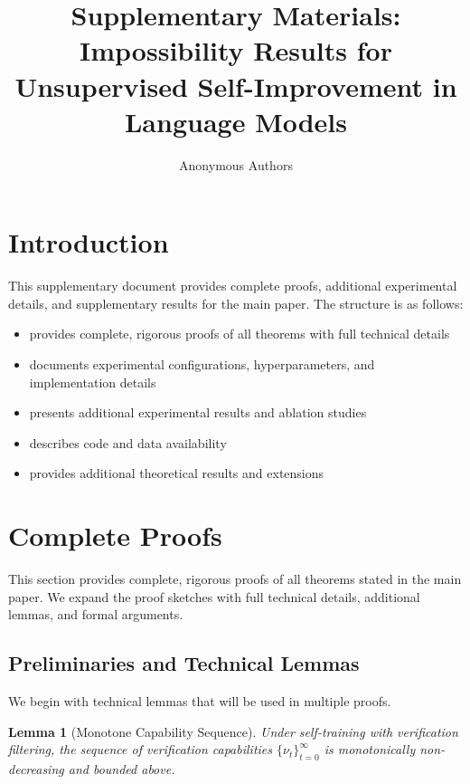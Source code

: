 \documentclass{article}
\title{Supplementary Materials: \\
Impossibility Results for Unsupervised Self-Improvement in Language Models}
\author{Anonymous Authors}
\newtheorem{lemma}[theorem]{Lemma}
\theoremstyle{definition}
\theoremstyle{remark}
\begin{document}
\maketitle

\tableofcontents

\section{Introduction}

This supplementary document provides complete proofs, additional experimental details, and supplementary results for the main paper. The structure is as follows:

\begin{itemize}
\item {} provides complete, rigorous proofs of all theorems with full technical details
\item {} documents experimental configurations, hyperparameters, and implementation details
\item {} presents additional experimental results and ablation studies
\item {} describes code and data availability
\item {} provides additional theoretical results and extensions
\end{itemize}

\section{Complete Proofs}
\label{sec:complete-proofs}

This section provides complete, rigorous proofs of all theorems stated in the main paper. We expand the proof sketches with full technical details, additional lemmas, and formal arguments.

\subsection{Preliminaries and Technical Lemmas}

We begin with technical lemmas that will be used in multiple proofs.

\begin{lemma}[Monotone Capability Sequence]
\label{lem:monotone-capability}
Under self-training with verification filtering, the sequence of verification capabilities \(\{\nu_t\}_{t=0}^\infty\) is monotonically non-decreasing and bounded above.
\end{lemma}
\end{document}
